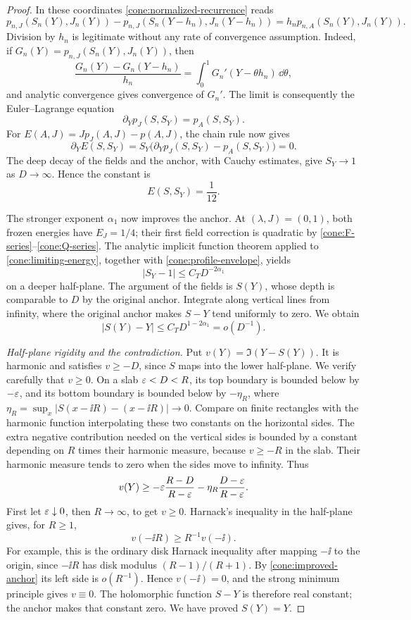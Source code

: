 \begin{proof}
In these coordinates \eqref{cone:normalized-recurrence} reads
\[
 p_{n,J}(S_n(Y),J_n(Y))
 -p_{n,J}(S_n(Y-h_n),J_n(Y-h_n))
 =h_n p_{n,A}(S_n(Y),J_n(Y)).
\]
Division by \(h_n\) is legitimate without any rate of convergence
assumption. Indeed, if
\(G_n(Y)=p_{n,J}(S_n(Y),J_n(Y))\), then
\[
 \frac{G_n(Y)-G_n(Y-h_n)}{h_n}
 =\int_0^1G_n'(Y-\theta h_n)\,\dd\theta,
\]
and analytic convergence gives convergence of \(G_n'\).
The limit is consequently the Euler--Lagrange equation
\[
 \partial_Yp_J(S,S_Y)=p_A(S,S_Y).
\]
For \(E(A,J)=Jp_J(A,J)-p(A,J)\), the chain rule now gives
\[
 \partial_Y E(S,S_Y)
 =S_Y\bigl(\partial_Yp_J(S,S_Y)-p_A(S,S_Y)\bigr)=0.
\]
The deep decay of the fields and the anchor, with Cauchy estimates,
give \(S_Y\to1\) as \(D\to\infty\). Hence the constant is
\begin{equation}\label{cone:limiting-energy}
 E(S,S_Y)=\frac1{12}.
\end{equation}

The stronger exponent \(\alpha_1\) now improves the anchor. At
\((\lambda,J)=(0,1)\), both frozen energies have
\(E_J=1/4\); their first field correction is quadratic by
\eqref{cone:F-series}--\eqref{cone:Q-series}. The analytic implicit
function theorem applied to \eqref{cone:limiting-energy}, together
with \eqref{cone:profile-envelope}, yields
\[
 |S_Y-1|\le C_TD^{-2\alpha_1}
\]
on a deeper half-plane. The argument of the fields is \(S(Y)\), whose
depth is comparable to \(D\) by the original anchor. Integrate along
vertical lines from infinity, where the original anchor makes
\(S-Y\) tend uniformly to zero. We obtain
\begin{equation}\label{cone:improved-anchor}
 |S(Y)-Y|\le C_TD^{1-2\alpha_1}=o(D^{-1}).
\end{equation}

\medskip\noindent
\emph{Half-plane rigidity and the contradiction.}
Put \(v(Y)=\Im(Y-S(Y))\). It is harmonic and satisfies \(v\ge-D\),
since \(S\) maps into the lower half-plane. We verify carefully that
\(v\ge0\). On a slab \(\varepsilon<D<R\), its top boundary is bounded below
by \(-\varepsilon\), and its bottom boundary is bounded below by
\(-\eta_R\), where
\(\eta_R=\sup_x|S(x-\ii R)-(x-\ii R)|\to0\). Compare on finite
rectangles with the harmonic function interpolating these two
constants on the horizontal sides. The extra negative contribution
needed on the vertical sides is bounded by a constant depending on
\(R\) times their harmonic measure, because \(v\ge-R\) in the slab.
Their harmonic measure tends to zero when the sides move to infinity.
Thus
\[
 v(Y)\ge-\varepsilon\frac{R-D}{R-\varepsilon}
              -\eta_R\frac{D-\varepsilon}{R-\varepsilon}.
\]
First let \(\varepsilon\downarrow0\), then \(R\to\infty\), to get
\(v\ge0\). Harnack's inequality in the half-plane gives, for
\(R\ge1\),
\[
 v(-\ii R)\ge R^{-1}v(-\ii).
\]
For example, this is the ordinary disk Harnack inequality after
mapping \(-\ii\) to the origin, since \(-\ii R\) has disk modulus
\((R-1)/(R+1)\). By \eqref{cone:improved-anchor} its left side is
\(o(R^{-1})\). Hence \(v(-\ii)=0\), and the strong minimum principle
gives \(v\equiv0\). The holomorphic function \(S-Y\) is therefore real
constant; the anchor makes that constant zero. We have proved
\(S(Y)=Y\).


\end{proof}
